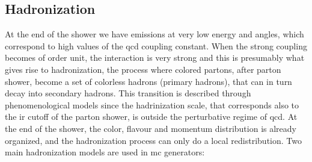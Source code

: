\subsection{Hadronization}

At the end of the shower we have emissions at very low energy and angles, which correspond to high values of the \gls{qcd} coupling constant. 
When the strong coupling becomes of order unit, the interaction is very strong and this is presumably what gives rise to hadronization, the process where colored partons, after parton shower, become a set of colorless hadrons (primary hadrons), 
that can in turn decay into secondary hadrons. This transition is described through phenomenological models since the hadrinization scale, that corresponds also to the \gls{ir} cutoff of the parton shower, is outside the perturbative regime of \gls{qcd}. At the end of the shower, the color, flavour and momentum distribution is already organized, and the hadronization process can only do a local redistribution.
Two main hadronization models are used in \gls{mc} generators:

